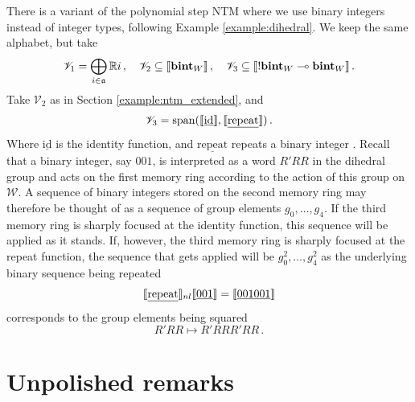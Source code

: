 \documentclass[english,letter paper,12pt,leqno]{article}
\theoremstyle{example}
\newtheorem{example}[theorem]{Example}
\newtheorem{remark}[theorem]{Remark}
\numberwithin{equation}{section}
\DeclareMathOperator{\End}{End}
\begin{document}
There is a variant of the polynomial step NTM where we use binary integers instead of integer types, following Example \ref{example:dihedral}. We keep the same alphabet, but take
\[
\mathscr{V}_1 = \bigoplus_{i \in \mathfrak{a}} \mathbb{R} i\,, \quad \mathscr{V}_2 \subseteq \llbracket \textbf{bint}_W \rrbracket\,, \quad \mathscr{V}_3 \subseteq \llbracket {!}\textbf{bint}_W \multimap \textbf{bint}_W \rrbracket\,.
\]
Take $\mathscr{V}_2$ as in Section \ref{example:ntm_extended}, and
\[
\mathscr{V}_3 = \operatorname{span}(\llbracket \underline{\mathrm{id}} \rrbracket, \llbracket \underline{\mathrm{repeat}} \rrbracket)\,.
\]
Where $\underline{\mathrm{id}}$ is the identity function, and $\underline{\mathrm{repeat}}$ repeats a binary integer \cite[\S 3.2]{murfetclift}. Recall that a binary integer, say $001$, is interpreted as a word $R'RR$ in the dihedral group and acts on the first memory ring according to the action of this group on $\mathscr{W}$. A sequence of binary integers stored on the second memory ring may therefore be thought of as a sequence of group elements $g_0,\ldots,g_4$. If the third memory ring is sharply focused at the identity function, this sequence will be applied as it stands. If, however, the third memory ring is sharply focused at the repeat function, the sequence that gets applied will be $g_0^2, \ldots, g_4^2$ as the underlying binary sequence being repeated
\[
\llbracket \underline{\mathrm{repeat}} \rrbracket_{nl} \llbracket \underline{001} \rrbracket = \llbracket \underline{001001} \rrbracket
\]
corresponds to the group elements being squared
\[
R'RR \longmapsto R'RRR'RR\,.
\]

\section{Unpolished remarks}


\end{document}
